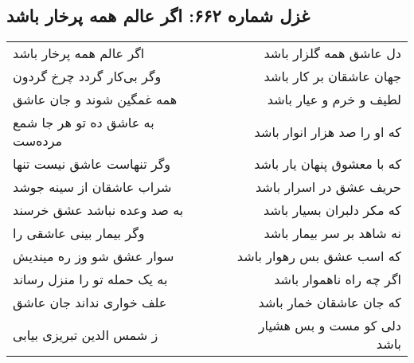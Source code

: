 \begin{center}
\section*{غزل شماره ۶۶۲: اگر عالم همه پرخار باشد}
\label{sec:0662}
\begin{longtable}{l p{0.5cm} r}
اگر عالم همه پرخار باشد
&&
دل عاشق همه گلزار باشد
\\
وگر بی‌کار گردد چرخ گردون
&&
جهان عاشقان بر کار باشد
\\
همه غمگین شوند و جان عاشق
&&
لطیف و خرم و عیار باشد
\\
به عاشق ده تو هر جا شمع مرده‌ست
&&
که او را صد هزار انوار باشد
\\
وگر تنهاست عاشق نیست تنها
&&
که با معشوق پنهان یار باشد
\\
شراب عاشقان از سینه جوشد
&&
حریف عشق در اسرار باشد
\\
به صد وعده نباشد عشق خرسند
&&
که مکر دلبران بسیار باشد
\\
وگر بیمار بینی عاشقی را
&&
نه شاهد بر سر بیمار باشد
\\
سوار عشق شو وز ره میندیش
&&
که اسب عشق بس رهوار باشد
\\
به یک حمله تو را منزل رساند
&&
اگر چه راه ناهموار باشد
\\
علف خواری نداند جان عاشق
&&
که جان عاشقان خمار باشد
\\
ز شمس الدین تبریزی بیابی
&&
دلی کو مست و بس هشیار باشد
\\
\end{longtable}
\end{center}
